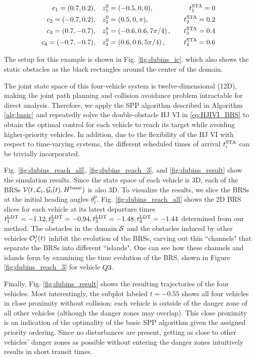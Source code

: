 \begin{equation}
\begin{aligned}
c_1 = (0.7, 0.2), \quad& z_1^0 = (-0.5, 0, 0), \quad & t^\text{STA}_1 = 0 \\
c_2 = (-0.7, 0.2), \quad& z_2^0 = (0.5, 0, \pi), \quad & t^\text{STA}_2 = 0.2 \\
c_3 = (0.7, -0.7), \quad& z_3^0 = \left(-0.6, 0.6, 7\pi/4\right), \quad & t^\text{STA}_3 = 0.4\\
c_4 = (-0.7, -0.7), \quad & z_4^0 = \left(0.6, 0.6, 5\pi/4\right), \quad & t^\text{STA}_4 = 0.6
\end{aligned}
\end{equation}

The setup for this example is shown in Fig. \ref{fig:dubins_ic}, which also shows the static obstacles as the black rectangles around the center of the domain.

The joint state space of this four-vehicle system is twelve-dimensional (12D), making the joint path planning and collision avoidance problem intractable for direct analysis. Therefore, we apply the SPP algorithm described in Algorithm \ref{alg:basic} and repeatedly solve the double-obstacle HJ VI in \eqref{eq:HJIVI_BRS} to obtain the optimal control for each vehicle to reach its target while avoiding higher-priority vehicles. In addition, due to the flexibility of the HJ VI with respect to time-varying systems, the different scheduled times of arrival $t^\text{STA}_i$ can be trivially incorporated. 

Fig. \ref{fig:dubins_reach_all}, \ref{fig:dubins_reach_3}, and \ref{fig:dubins_result} show the simulation results. Since the state space of each vehicle is 3D, each of the BRSs $\mathcal{V}(t, \mathcal{L}_i, \mathcal{G}_i(t), H^\text{basic})$ is also 3D. To visualize the results, we slice the BRSs at the initial heading angles $\theta_i^0$. Fig. \ref{fig:dubins_reach_all} shows the 2D BRS slices for each vehicle at its latest departure times $t^\text{LDT}_1=-1.12, t^\text{LDT}_2=-0.94,t^\text{LDT}_3=-1.48,t^\text{LDT}_4=-1.44$ determined from our method. The obstacles in the domain $\mathcal{S}$ and the obstacles induced by other vehicles $\mathcal{O}_i^j(t)$ inhibit the evolution of the BRSs, carving out thin ``channels" that separate the BRSs into different ``islands". One can see how these channels and islands form by examining the time evolution of the BRS, shown in Figure \ref{fig:dubins_reach_3} for vehicle $Q{3}$. 

Finally, Fig. \ref{fig:dubins_result} shows the resulting trajectories of the four vehicles. Most interestingly, the subplot labeled $t=-0.55$ shows all four vehicles in close proximity without collision: each vehicle is outside of the danger zone of all other vehicles (although the danger zones may overlap). This close proximity is an indication of the optimality of the basic SPP algorithm given the assigned priority ordering. Since no disturbances are present, getting as close to other vehicles' danger zones as possible without entering the danger zones intuitively results in short transit times.

